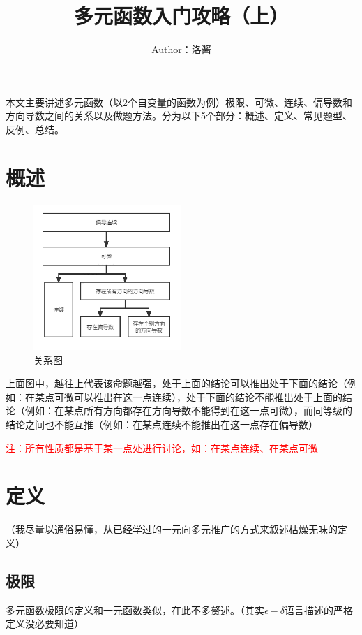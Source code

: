 \documentclass{article}
\title{多元函数入门攻略（上）}
\date{}
\author{Author：洛酱}
\begin{document}
\maketitle


本文主要讲述多元函数（以2个自变量的函数为例）极限、可微、连续、偏导数和方向导数之间的关系以及做题方法。分为以下5个部分：概述、定义、常见题型、反例、总结。



\tableofcontents

\newpage
\setcounter{page}{1}

\section{概述}
\begin{figure}[!h]
    \centering
    \includegraphics[width=0.5\textwidth]{pic/01.png}
    \caption{关系图}
\end{figure}

上面图中，越往上代表该命题越强，处于上面的结论可以推出处于下面的结论（例如：在某点可微可以推出在这一点连续），处于下面的结论不能推出处于上面的结论（例如：在某点所有方向都存在方向导数不能得到在这一点可微），而同等级的结论之间也不能互推（例如：在某点连续不能推出在这一点存在偏导数）

\textcolor{red}{注：所有性质都是基于某一点处进行讨论，如：在某点连续、在某点可微}


\section{定义}
（我尽量以通俗易懂，从已经学过的一元向多元推广的方式来叙述枯燥无味的定义）

\subsection{极限}
多元函数极限的定义和一元函数类似，在此不多赘述。（其实$\epsilon-\delta$语言描述的严格定义没必要知道）
\end{document}
